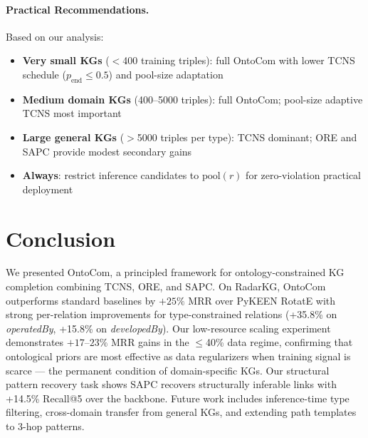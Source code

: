\documentclass[10pt,twocolumn]{article}
\begin{document}
\paragraph{Practical Recommendations.}
Based on our analysis:
\begin{itemize}
  \item \textbf{Very small KGs} ($<$400 training triples): full OntoCom with
    lower TCNS schedule ($p_{\text{end}} \leq 0.5$) and pool-size adaptation
  \item \textbf{Medium domain KGs} (400--5000 triples): full OntoCom;
    pool-size adaptive TCNS most important
  \item \textbf{Large general KGs} ($>$5000 triples per type): TCNS dominant;
    ORE and SAPC provide modest secondary gains
  \item \textbf{Always}: restrict inference candidates to $\text{pool}(r)$
    for zero-violation practical deployment
\end{itemize}

\section{Conclusion}

We presented OntoCom, a principled framework for ontology-constrained KG completion
combining TCNS, ORE, and SAPC. On RadarKG, OntoCom outperforms standard baselines
by $+25\%$ MRR over PyKEEN RotatE with strong per-relation improvements for
type-constrained relations (+35.8\% on \textit{operatedBy}, +15.8\% on
\textit{developedBy}). Our low-resource scaling experiment demonstrates
$+17$--$23\%$ MRR gains in the $\leq$40\% data regime, confirming that
ontological priors are most effective as data regularizers when training signal
is scarce --- the permanent condition of domain-specific KGs.
Our structural pattern recovery task shows SAPC recovers structurally inferable
links with +14.5\% Recall@5 over the backbone.
Future work includes inference-time type filtering, cross-domain transfer from
general KGs, and extending path templates to 3-hop patterns.
\end{document}
